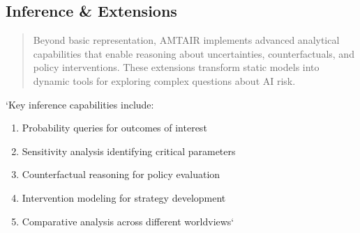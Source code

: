 \documentclass[12pt,a4paper]{report}
\providecommand{\tightlist}{%
  \setlength{\itemsep}{0pt}\setlength{\parskip}{0pt}}
\begin{document}
\subsection{Inference \& Extensions}\label{sec-inference-extensions}

\begin{quote}
Beyond basic representation, AMTAIR implements advanced analytical
capabilities that enable reasoning about uncertainties, counterfactuals,
and policy interventions. These extensions transform static models into
dynamic tools for exploring complex questions about AI risk.
\end{quote}

`Key inference capabilities include:

\begin{enumerate}
\def\labelenumi{\arabic{enumi}.}
\tightlist
\item
  Probability queries for outcomes of interest
\item
  Sensitivity analysis identifying critical parameters
\item
  Counterfactual reasoning for policy evaluation
\item
  Intervention modeling for strategy development
\item
  Comparative analysis across different worldviews`
\end{enumerate}
\end{document}
